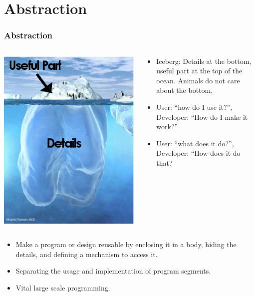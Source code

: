 \section{Abstraction}
\begin{frame}
\frametitle{Abstraction}
\begin{columns}
 \begin{column}{.3\linewidth}
  \includegraphics[width=\linewidth]{iceberg}
 \end{column}
\begin{column}{.7\linewidth}
\begin{itemize}[<+->]
\item Iceberg: Details at the bottom, useful part at the top of the ocean. Animals do not care
about the bottom.
\item User: ``how do I use it?'', Developer: ``How do I make it work?''
\item User: ``what does it do?'', Developer: ``How does it do that?
\end{itemize}
\end{column}
\end{columns}
\begin{itemize}
\item {} Make a program or design reusable by enclosing it in a body,
hiding the details, and defining a mechanism to access it.
\item Separating the usage and implementation of program segments.
\item Vital large scale programming.
\end{itemize}
\end{frame}

